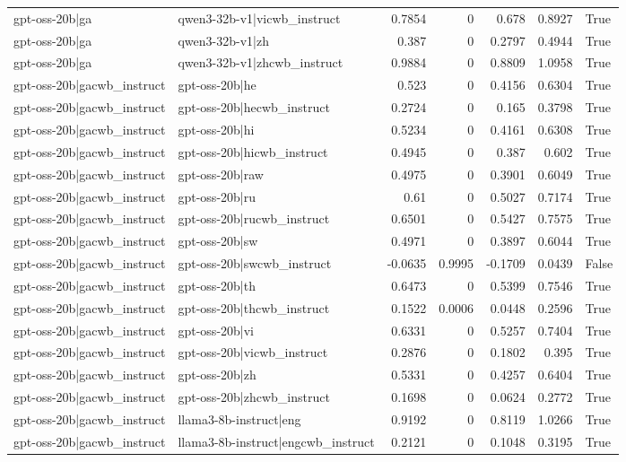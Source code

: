 \begin{table}
\begin{tabular}{l l r r r r l}
gpt-oss-20b|ga & qwen3-32b-v1|vicwb_instruct & 0.7854 & 0 & 0.678 & 0.8927 & True \\
gpt-oss-20b|ga & qwen3-32b-v1|zh & 0.387 & 0 & 0.2797 & 0.4944 & True \\
gpt-oss-20b|ga & qwen3-32b-v1|zhcwb_instruct & 0.9884 & 0 & 0.8809 & 1.0958 & True \\
gpt-oss-20b|gacwb_instruct & gpt-oss-20b|he & 0.523 & 0 & 0.4156 & 0.6304 & True \\
gpt-oss-20b|gacwb_instruct & gpt-oss-20b|hecwb_instruct & 0.2724 & 0 & 0.165 & 0.3798 & True \\
gpt-oss-20b|gacwb_instruct & gpt-oss-20b|hi & 0.5234 & 0 & 0.4161 & 0.6308 & True \\
gpt-oss-20b|gacwb_instruct & gpt-oss-20b|hicwb_instruct & 0.4945 & 0 & 0.387 & 0.602 & True \\
gpt-oss-20b|gacwb_instruct & gpt-oss-20b|raw & 0.4975 & 0 & 0.3901 & 0.6049 & True \\
gpt-oss-20b|gacwb_instruct & gpt-oss-20b|ru & 0.61 & 0 & 0.5027 & 0.7174 & True \\
gpt-oss-20b|gacwb_instruct & gpt-oss-20b|rucwb_instruct & 0.6501 & 0 & 0.5427 & 0.7575 & True \\
gpt-oss-20b|gacwb_instruct & gpt-oss-20b|sw & 0.4971 & 0 & 0.3897 & 0.6044 & True \\
gpt-oss-20b|gacwb_instruct & gpt-oss-20b|swcwb_instruct & -0.0635 & 0.9995 & -0.1709 & 0.0439 & False \\
gpt-oss-20b|gacwb_instruct & gpt-oss-20b|th & 0.6473 & 0 & 0.5399 & 0.7546 & True \\
gpt-oss-20b|gacwb_instruct & gpt-oss-20b|thcwb_instruct & 0.1522 & 0.0006 & 0.0448 & 0.2596 & True \\
gpt-oss-20b|gacwb_instruct & gpt-oss-20b|vi & 0.6331 & 0 & 0.5257 & 0.7404 & True \\
gpt-oss-20b|gacwb_instruct & gpt-oss-20b|vicwb_instruct & 0.2876 & 0 & 0.1802 & 0.395 & True \\
gpt-oss-20b|gacwb_instruct & gpt-oss-20b|zh & 0.5331 & 0 & 0.4257 & 0.6404 & True \\
gpt-oss-20b|gacwb_instruct & gpt-oss-20b|zhcwb_instruct & 0.1698 & 0 & 0.0624 & 0.2772 & True \\
gpt-oss-20b|gacwb_instruct & llama3-8b-instruct|eng & 0.9192 & 0 & 0.8119 & 1.0266 & True \\
gpt-oss-20b|gacwb_instruct & llama3-8b-instruct|engcwb_instruct & 0.2121 & 0 & 0.1048 & 0.3195 & True \\

\end{tabular}
\end{table}
